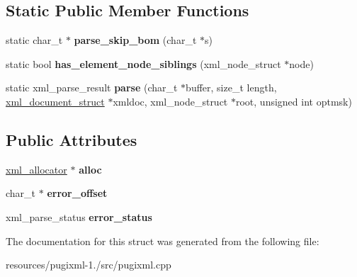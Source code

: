 \subsection*{Static Public Member Functions}
\begin{DoxyCompactItemize}
\item 
\hypertarget{structxml__parser_af0a3f5a488b05da9fa2c87e1dd1f9eda}{static char\+\_\+t $\ast$ {\bfseries parse\+\_\+skip\+\_\+bom} (char\+\_\+t $\ast$s)}\label{structxml__parser_af0a3f5a488b05da9fa2c87e1dd1f9eda}

\item 
\hypertarget{structxml__parser_a6be4da5b3206913d0e3bd8320394df41}{static bool {\bfseries has\+\_\+element\+\_\+node\+\_\+siblings} (xml\+\_\+node\+\_\+struct $\ast$node)}\label{structxml__parser_a6be4da5b3206913d0e3bd8320394df41}

\item 
\hypertarget{structxml__parser_a4bf0acd166edf3fc6cc9543002ff6f5d}{static xml\+\_\+parse\+\_\+result {\bfseries parse} (char\+\_\+t $\ast$buffer, size\+\_\+t length, \hyperlink{structxml__document__struct}{xml\+\_\+document\+\_\+struct} $\ast$xmldoc, xml\+\_\+node\+\_\+struct $\ast$root, unsigned int optmsk)}\label{structxml__parser_a4bf0acd166edf3fc6cc9543002ff6f5d}

\end{DoxyCompactItemize}
\subsection*{Public Attributes}
\begin{DoxyCompactItemize}
\item 
\hypertarget{structxml__parser_a48f48b81a9a222b8bcb79f95024faad8}{\hyperlink{structxml__allocator}{xml\+\_\+allocator} $\ast$ {\bfseries alloc}}\label{structxml__parser_a48f48b81a9a222b8bcb79f95024faad8}

\item 
\hypertarget{structxml__parser_a2476a71cd7e67b3f4bdbcd1323524503}{char\+\_\+t $\ast$ {\bfseries error\+\_\+offset}}\label{structxml__parser_a2476a71cd7e67b3f4bdbcd1323524503}

\item 
\hypertarget{structxml__parser_a0555859911674e5a7a349447d6533383}{xml\+\_\+parse\+\_\+status {\bfseries error\+\_\+status}}\label{structxml__parser_a0555859911674e5a7a349447d6533383}

\end{DoxyCompactItemize}


The documentation for this struct was generated from the following file\+:\begin{DoxyCompactItemize}
\item 
resources/pugixml-\/1./src/pugixml.\+cpp\end{DoxyCompactItemize}
